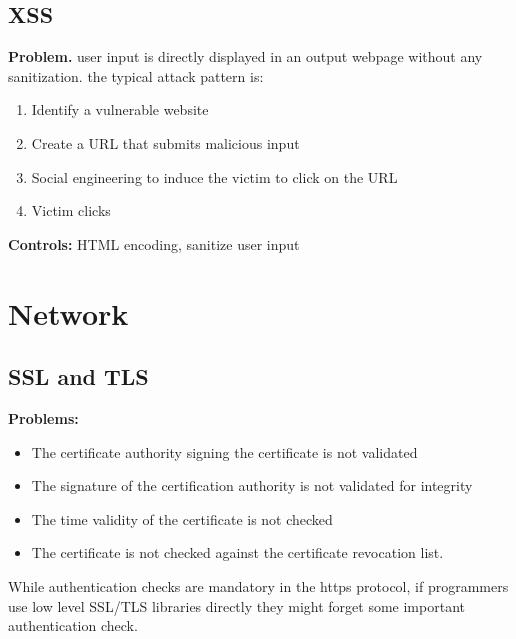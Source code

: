 \documentclass[10pt,a4paper]{book}
\begin{document}
\section{XSS}
\textbf{Problem.} user input is directly displayed in an output webpage without any sanitization. the typical attack pattern is:
\begin{enumerate}
\item Identify a vulnerable website
\item Create a URL that submits malicious input
\item Social engineering to induce the victim to click on the URL
\item Victim clicks
\end{enumerate}
\textbf{Controls:} HTML encoding, sanitize user input
\chapter{Network}
\section{SSL and TLS}
\textbf{Problems:}
\begin{itemize}
\item The certificate authority signing the certificate is not validated
\item The signature of the certification authority is not validated for integrity
\item The time validity of the certificate is not checked
\item The certificate is not checked against the certificate revocation list.
\end{itemize}
While authentication checks are mandatory in the https protocol, if programmers use low level SSL/TLS libraries directly they might forget some important authentication check.
\end{document}
